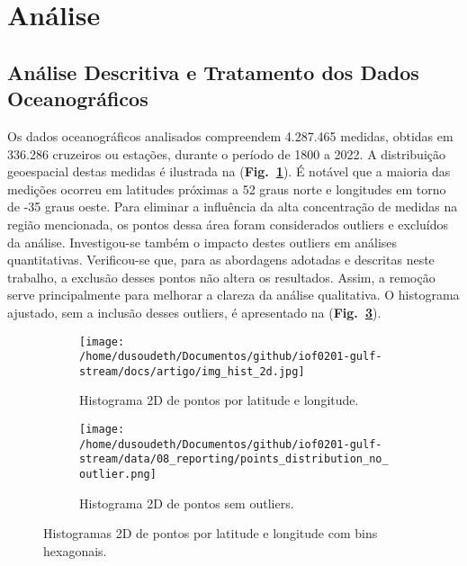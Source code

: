 \documentclass[journal]{IEEEtran}
\newcommand{\figref}[1]{(\textbf{Fig.~\ref{#1}})}
\begin{document}
    \section{Análise}
        \subsection{Análise Descritiva e Tratamento dos Dados Oceanográficos}
            Os dados oceanográficos analisados compreendem 4.287.465 medidas, obtidas em 336.286 cruzeiros ou estações, durante o período de 1800 a 2022. A distribuição geoespacial destas medidas é ilustrada na \figref{fig:img_hist_2d}. É notável que a maioria das medições ocorreu em latitudes próximas a 52 graus norte e longitudes em torno de -35 graus oeste. Para eliminar a influência da alta concentração de medidas na região mencionada, os pontos dessa área foram considerados outliers e excluídos da análise. Investigou-se também o impacto destes outliers em análises quantitativas. Verificou-se que, para as abordagens adotadas e descritas neste trabalho, a exclusão desses pontos não altera os resultados. Assim, a remoção serve principalmente para melhorar a clareza da análise qualitativa. O histograma ajustado, sem a inclusão desses outliers, é apresentado na \figref{fig:img_hist_2d_no_outliers}.
            \begin{figure}[ht]
                \centering
                \begin{subfigure}[b]{0.45\linewidth}
                    \texttt{[image: /home/dusoudeth/Documentos/github/iof0201-gulf-stream/docs/artigo/img\_hist\_2d.jpg]}
                    \caption{Histograma 2D de pontos por latitude e longitude.}
                    \label{fig:img_hist_2d}
                \end{subfigure}
                \begin{subfigure}[b]{0.45\linewidth}
                    \texttt{[image: /home/dusoudeth/Documentos/github/iof0201-gulf-stream/data/08\_reporting/points\_distribution\_no\_outlier.png]}
                    \caption{Histograma 2D de pontos sem outliers.}
                    \label{fig:img_hist_2d_no_outliers}
                \end{subfigure}
                \caption{Histogramas 2D de pontos por latitude e longitude com bins hexagonais.}
            \end{figure}
\end{document}
